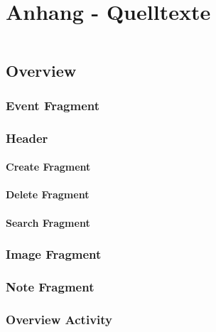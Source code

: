 \section{Anhang - Quelltexte}
\label{instal}

\begin{figure}[H]
\begin{lstlisting}[caption=Titel (Vorname Nachname)]

\end{lstlisting}
\end{figure}


\subsection{Overview}
	\subsubsection{Event Fragment}
	\subsubsection{Header}
		\paragraph{Create Fragment}
		\paragraph{Delete Fragment}
		\paragraph{Search Fragment}
	\subsubsection{Image Fragment}
	\subsubsection{Note Fragment}
	\subsubsection{Overview Activity}
